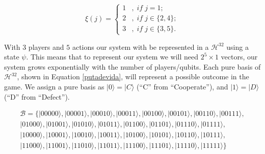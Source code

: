\begin{equation}
\xi(j)=\begin{cases}
1 & ,\; if\; j=1;\\
2 & ,\; if\; j\in\{2,4\};\\
3 & ,\; if\; j\in\{3,5\}.
\end{cases}
\label{playerxiximapping}
\end{equation}


With $3$ players and $5$ actions our system with be represented in a $\mathcal{H}^{32}$ using a state $\psi$. This means that to represent our system we will need $2^{5}\times 1$ vectors, our system grows exponentially with the number of players/qubits. Each pure basis  of $\mathcal{H}^{32}$, shown in Equation \ref{putadevida}, will represent a possible outcome in the game. We assign a pure basis as $\vert 0\rangle = \vert C\rangle$ (``C'' from ``Cooperate''), and $\vert 1\rangle = \vert D\rangle$ (``D'' from ``Defect''). 


\begin{equation}
\begin{split}
\mathcal{B}= \{ \vert 00000\rangle , \vert 00001\rangle , \vert 00010\rangle , \vert 00011\rangle , \vert 00100\rangle , \vert 00101\rangle , \vert 00110\rangle , \vert 00111\rangle, \\
 \vert 01000\rangle , \vert 01001\rangle , \vert 01010\rangle , \vert 01011\rangle , \vert 01100\rangle , \vert 01101\rangle , \vert 01110\rangle , \vert 01111\rangle, \\
 \vert 10000\rangle , \vert 10001\rangle , \vert 10010\rangle , \vert 10011\rangle , \vert 10100\rangle , \vert 10101\rangle , \vert 10110\rangle , \vert 10111\rangle, \\
 \vert 11000\rangle , \vert 11001\rangle , \vert 11010\rangle , \vert 11011\rangle , \vert 11100\rangle , \vert 11101\rangle , \vert 11110\rangle , \vert 11111\rangle \}
\end{split}
\label{putadevida}
\end{equation}








